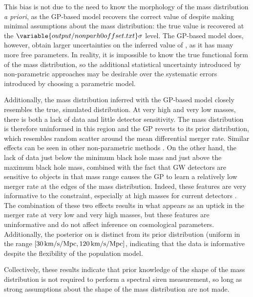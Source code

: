 \documentclass[]{aastex631}
\begin{document}
This bias is not due to the need to know the morphology of the mass distribution \emph{a priori}, as the \ac{GP}-based model recovers the correct value of \Ho{} despite making minimal assumptions about the mass distribution: the true value is recovered at the $\variable{output/nonparh0offset.txt}\sigma$ level.
The \ac{GP}-based model does, however, obtain larger uncertainties on the inferred value of \Ho, as it has many more free parameters. 
In reality, it is impossible to know the true functional form of the mass distribution, so the additional statistical uncertainty introduced by non-parametric approaches may be desirable over the systematic errors introduced by choosing a parametric model.

Additionally, the mass distribution inferred with the \ac{GP}-based model closely resembles the true, simulated distribution.
At very high and very low masses, there is both a lack of data and little detector sensitivity.
The mass distribution is therefore uninformed in this region and the \ac{GP} reverts to its prior distribution, which resembles random scatter around the mean differential merger rate.
Similar effects can be seen in other non-parametric methods \citep{edelman_cover_2023, callister_parameter-free_2023}.
On the other hand, the lack of data just below the minimum black hole mass and just above the maximum black hole mass, combined with the fact that \ac{GW} detectors are sensitive to objects in that mass range causes the \ac{GP} to learn a relatively low merger rate at the edges of the mass distribution.
Indeed, these features are very informative to the \Ho{} constraint, especially at high masses for current detectors \citep{gwtc3_cosmo}.
The combination of these two effects results in what appears as an uptick in the merger rate at very low and very high masses, but these features are uninformative and do not affect inference on cosmological parameters.
Additionally, the posterior on \Ho{} is distinct from its prior distribution (uniform in the range $[30\,\text{km/s/Mpc},120\,\text{km/s/Mpc}]$, indicating that the data is informative despite the flexibility of the population model.

Collectively, these results indicate that prior knowledge of the shape of the mass distribution is not required to perform a spectral siren measurement, so long as strong assumptions about the shape of the mass distribution are not made.
\end{document}
